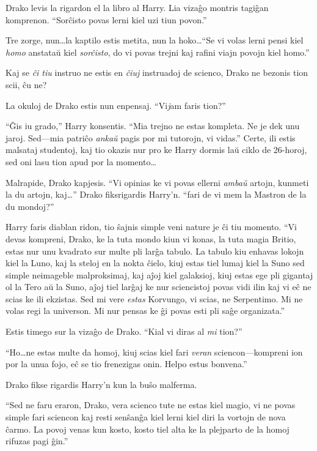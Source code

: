 Drako levis la rigardon el la libro al Harry. Lia vizaĝo montris
tagiĝan komprenon. ``Sorĉisto povas lerni kiel uzi tiun povon.''

Tre zorge, nun\ldots la kaptilo estis metita, nun la hoko\ldots ``Se vi
volas lerni pensi kiel \emph{homo} anstataŭ kiel \emph{sorĉisto}, do
vi povas trejni kaj rafini viajn povojn kiel homo.''

Kaj se \emph{ĉi tiu} instruo ne estis en \emph{ĉiuj} instruadoj de
scienco, Drako ne bezonis tion scii, ĉu ne?

La okuloj de Drako estis nun enpensaj. ``Vi\emph jam faris tion?''

``Ĝis iu grado,'' Harry konsentis. ``Mia trejno ne estas kompleta. Ne
je dek unu jaroj. Sed—mia patriĉo \emph{ankaŭ} pagis por mi tutorojn,
vi vidas.'' Certe, ili estis malsataj studentoj, kaj tio okazis nur
pro ke Harry dormis laŭ ciklo de 26-horoj, sed oni lasu tion apud por
la momento\ldots

Malrapide, Drako kapjesis. ``Vi opinias ke vi povas ellerni
\emph{ambaŭ} artojn, kunmeti la du artojn, kaj\ldots'' Drako
fiksrigardis Harry'n. ``fari de vi mem la Mastron de la du mondoj?''

Harry faris diablan ridon, tio ŝajnis simple veni nature je ĉi tiu
momento. ``Vi devas kompreni, Drako, ke la tuta mondo kiun vi konas,
la tuta magia Britio, estas nur unu kvadrato sur multe pli larĝa
tabulo. La tabulo kiu enhavas lokojn kiel la Luno, kaj la steloj en la
nokta ĉielo, kiuj estas tiel lumaj kiel la Suno sed simple neimageble
malproksimaj, kaj aĵoj kiel galaksioj, kiuj estas ege pli gigantaj ol
la Tero aŭ la Suno, aĵoj tiel larĝaj ke nur sciencistoj povas vidi
ilin kaj vi eĉ ne scias ke ili ekzistas. Sed mi vere \emph{estas}
Korvungo, vi scias, ne Serpentimo. Mi ne volas regi la universon. Mi
nur pensas ke ĝi povas esti pli saĝe organizata.''

Estis timego sur la vizaĝo de Drako. ``Kial vi diras al \emph{mi} tion?''

``Ho\ldots ne estas multe da homoj, kiuj scias kiel fari \emph{veran}
sciencon—kompreni ion por la unua fojo, eĉ se tio frenezigas onin. Helpo
estus bonvena.''

Drako fikse rigardis Harry'n kun la buŝo malferma.

``Sed ne faru eraron, Drako, vera scienco tute ne estas kiel magio, vi
ne povas simple fari sciencon kaj resti senŝanĝa kiel lerni kiel diri la
vortojn de nova ĉarmo. La povoj venas kun kosto, kosto tiel alta ke la
plejparto de la homoj rifuzas pagi ĝin.''

